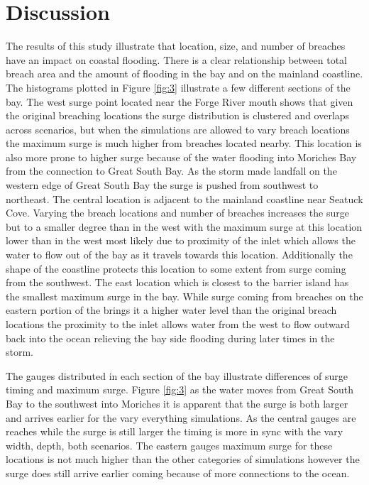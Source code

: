 \documentclass{coastal_paper}
\begin{document}
\section{Discussion}
The results of this study illustrate that location, size, and number of breaches have an impact on coastal flooding. There is a clear relationship between total breach area and the amount of flooding in the bay and on the mainland coastline. The histograms plotted in Figure \ref{fig:3} illustrate a few different sections of the bay. The west surge point located near the Forge River mouth shows that given the original breaching locations the surge distribution is clustered and overlaps across scenarios, but when the simulations are allowed to vary breach locations the maximum surge is much higher from breaches located nearby. This location is also more prone to higher surge because of the water flooding into Moriches Bay from the connection to Great South Bay. As the storm made landfall on the western edge of Great South Bay the surge is pushed from southwest to northeast.
The central location is adjacent to the mainland coastline near Seatuck Cove. Varying the breach locations and number of breaches increases the surge but to a smaller degree than in the west with the maximum surge at this location lower than in the west most likely due to proximity of the inlet which allows the water to flow out of the bay as it travels towards this location. Additionally the shape of the coastline protects this location to some extent from surge coming from the southwest. 
The east location which is closest to the barrier island has the smallest maximum surge in the bay. While surge coming from breaches on the eastern portion of the brings it a higher water level than the original breach locations the proximity to the inlet allows water from the west to flow outward back into the ocean relieving the bay side flooding during later times in the storm.

The gauges distributed in each section of the bay illustrate differences of surge timing and maximum surge. Figure \ref{fig:3} as the water moves from Great South Bay to the southwest into Moriches it is apparent that the surge is both larger and arrives earlier for the vary everything simulations. As the central gauges are reaches while the surge is still larger the timing is more in sync with the vary width, depth, both scenarios. The eastern gauges maximum surge for these locations is not much higher than the other categories of simulations however the surge does still arrive earlier coming because of more connections to the ocean.
\end{document}
